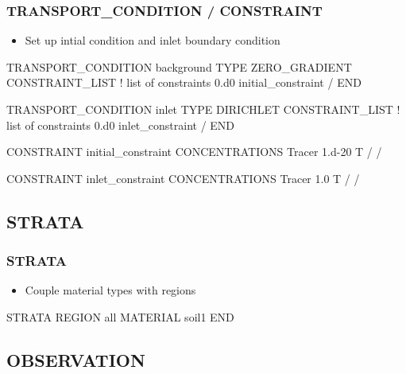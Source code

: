 \documentclass{beamer}
\newcommand\bluecomment[1]{{{\color{blue} #1}}}
\begin{document}
\begin{frame}\frametitle{TRANSPORT\_CONDITION / CONSTRAINT}

\begin{itemize}
  \item Set up intial condition and inlet boundary condition
\end{itemize}

{
\begin{semiverbatim}

TRANSPORT_CONDITION background
  TYPE ZERO_GRADIENT
    CONSTRAINT_LIST       \bluecomment{! list of constraints}
      0.d0 initial_constraint  
  /
END

TRANSPORT_CONDITION inlet      
  TYPE DIRICHLET
    CONSTRAINT_LIST       \bluecomment{! list of constraints}
      0.d0 inlet_constraint  
  /
END
\end{semiverbatim}
}

\newpage
{\small
\begin{semiverbatim}
CONSTRAINT initial_constraint
  CONCENTRATIONS
    Tracer  1.d-20  T 
  /
/

CONSTRAINT inlet_constraint
  CONCENTRATIONS
    Tracer  1.0  T
  /
/

\end{semiverbatim}
}

\end{frame}

\subsection{STRATA}

\begin{frame}[fragile]\frametitle{STRATA}

\begin{itemize}
\item Couple material types with regions
\end{itemize}

\begin{semiverbatim}
STRATA
  REGION all
  MATERIAL soil1
END

\end{semiverbatim}

\end{frame}


\subsection{OBSERVATION}
\end{document}
